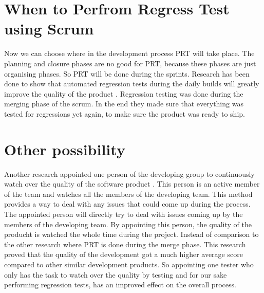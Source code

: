 \section{When to Perfrom Regress Test using Scrum} Now we can choose where in the development process PRT will take place. The planning and closure phases are no good for PRT, because these phases are just organising phases. So PRT will be done during the sprints. Research has been done to show that automated regression tests during the daily builds will greatly improve the quality of the product \cite{Future_of_Scrum}. Regression testing was done during the merging phase of the scrum. In the end they made sure that everything was tested for regressions yet again, to make sure the product was ready to ship.

\section{Other possibility}Another research appointed one person of the developing group to continuously watch over the quality of the software product \cite{Fully_Distributed_Scrum}. This person is an active member of the team and watches all the members of the developing team. This method provides a way to deal with any issues that could come up during the process. The appointed person will directly try to deal with issues coming up by the members of the developing team. By appointing this person, the quality of the producht is watched the whole time during the project. Instead of comparison to the other research where PRT is done during the merge phase. This research proved that the quality of the development got a much higher average score compared to other similar development products. So appointing one tester who only has the task to watch over the quality by testing and for our sake performing regression tests, has an improved effect on the overall process.

